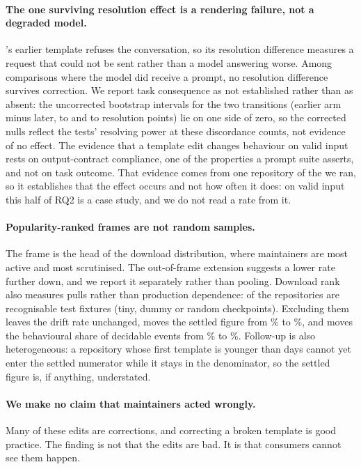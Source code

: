 \paragraph{The one surviving resolution effect is a rendering failure, not a degraded model.}
\ShortMistral's earlier template refuses the conversation, so its resolution difference measures a
request that could not be sent rather than a model answering worse. Among comparisons where the
model did receive a prompt, no resolution difference survives correction. We report task
consequence as not established rather than as absent: the uncorrected bootstrap intervals for the
two \ShortPhi{} transitions (earlier arm minus later, \PhiCIDownLo{} to \PhiCIDownHi{} and
\PhiCIUpLo{} to \PhiCIUpHi{}
resolution points) lie on one side of zero, so the corrected nulls reflect the tests' resolving
power at these discordance counts, not evidence of no effect.
The evidence that a template edit changes behaviour on valid input
rests on output-contract compliance, one of the properties a prompt suite asserts, and not on task
outcome. That evidence comes from one repository of the \NCheckpoints{} we ran, so it establishes
that the effect occurs and not how often it does: on valid input this half of RQ2 is a case study,
and we do not read a rate from it.

\paragraph{Popularity-ranked frames are not random samples.} The frame is the head of the download
distribution, where maintainers are most active and most scrutinised. The out-of-frame extension
suggests a lower rate further down, and we report it separately rather than pooling. Download rank
also measures pulls rather than production dependence: \NFixtures{} of the \NFrame{} repositories
are recognisable test fixtures (tiny, dummy or random checkpoints). Excluding them leaves the drift rate unchanged, moves the settled figure from
\PctBehSettledFrame\% to \PctBehSettledNoFix\%, and moves the behavioural share of decidable
events from \PctEventsBeh\% to \PctEventsBehNoFix\%. Follow-up is also heterogeneous: a repository
whose first template is younger than \SettledDays{} days cannot yet enter the settled numerator
while it stays in the denominator, so the settled figure is, if anything, understated.

\paragraph{We make no claim that maintainers acted wrongly.} Many of these edits are corrections, and
correcting a broken template is good practice. The finding is not that the edits are bad. It is that
consumers cannot see them happen.

